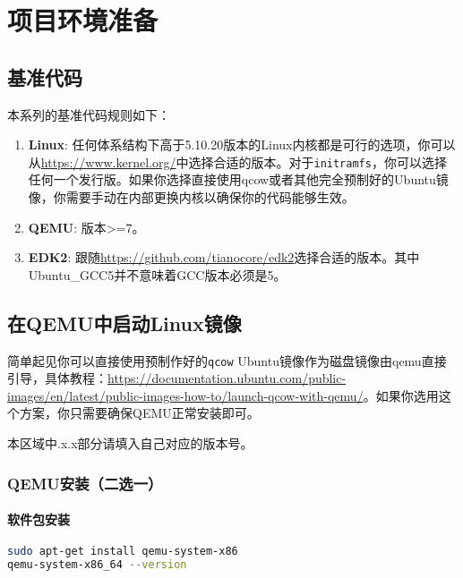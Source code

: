 \chapter{项目环境准备}

\section{基准代码}
本系列的基准代码规则如下：
\begin{enumerate}
    \item \textbf{Linux}: 任何体系结构下高于5.10.20版本的Linux内核都是可行的选项，你可以从\url{https://www.kernel.org/}中选择合适的版本。对于\texttt{initramfs}，你可以选择任何一个发行版。如果你选择直接使用qcow或者其他完全预制好的Ubuntu镜像，你需要手动在内部更换内核以确保你的代码能够生效。
    \item \textbf{QEMU}: 版本>=7。
    \item \textbf{EDK2}: 跟随\url{https://github.com/tianocore/edk2}选择合适的版本。其中Ubuntu\_GCC5并不意味着GCC版本必须是5。
\end{enumerate}

\section{在QEMU中启动Linux镜像}
\begin{remark}
    \label{qcow-ubuntu-image}
简单起见你可以直接使用预制作好的\texttt{qcow} Ubuntu镜像作为磁盘镜像由qemu直接引导，具体教程：\url{https://documentation.ubuntu.com/public-images/en/latest/public-images-how-to/launch-qcow-with-qemu/}。如果你选用这个方案，你只需要确保QEMU正常安装即可。
\end{remark}

\begin{remark}
    本区域中.x.x部分请填入自己对应的版本号。
\end{remark}



\subsection{QEMU安装（二选一）}
\subsubsection{软件包安装}
\begin{lstlisting}[language=bash]
sudo apt-get install qemu-system-x86
qemu-system-x86_64 --version
\end{lstlisting}

